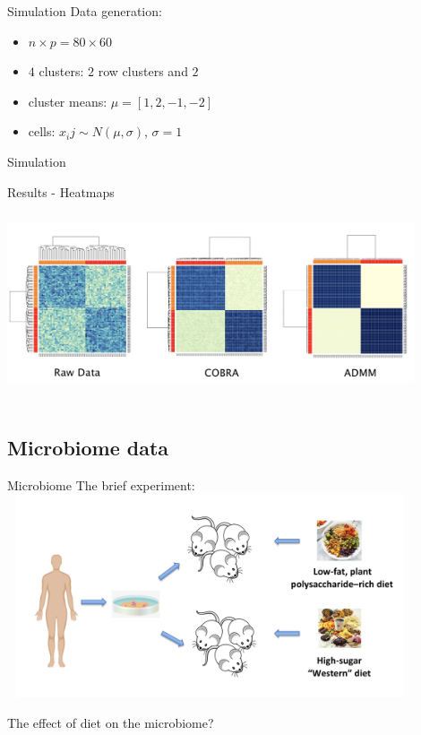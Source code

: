 \documentclass{beamer}
\begin{document}
\begin{frame}{Simulation}
    Data generation: 
    
    \begin{itemize}
        \item $n \times p = 80 \times 60$
        \item $4$ clusters: $2$ row clusters and $2$ 
        \item cluster means: $\mu = [1,2,-1,-2]$
        \item cells: $x_ij \sim N(\mu, \sigma)$, $\sigma = 1$
    \end{itemize}
\end{frame}


\begin{frame}{Simulation}

Results - Heatmaps
\centering
    \includegraphics[width=12cm,height=6cm,keepaspectratio]{sim}
\end{frame}

\subsection{Microbiome data}

\begin{frame}{Microbiome}
The brief experiment: 
    \centering
    \includegraphics[width=12cm,height=6cm,keepaspectratio]{exp}
    
    The effect of diet on the microbiome?
    
\end{frame}
\end{document}
